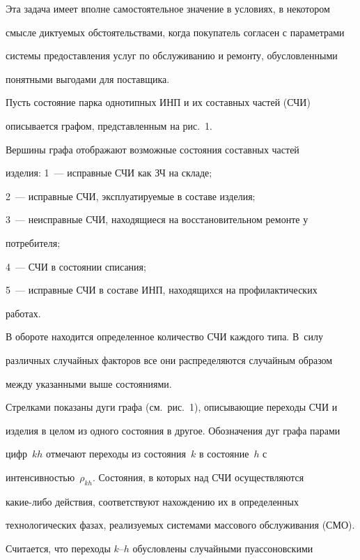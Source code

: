      Эта задача имеет вполне самостоятельное значение в условиях, в некото\-ром

смысле диктуемых обстоятельствами, когда покупатель согласен с параметрами

системы пред\-остав\-ле\-ния услуг по обслуживанию и ремонту, обусловленными

понятными выгодами для поставщика.









     Пусть состояние парка однотипных ИНП и их составных частей (СЧИ)

описывается графом, представленным на рис.~1.



     Вершины графа отображают возможные состояния составных частей

изделия: 1~--- исправные СЧИ как ЗЧ на складе;

    2~--- исправные СЧИ, эксплуатируемые в составе изделия;

    3~--- неисправные СЧИ, находящиеся на восстановительном ремонте у

потребителя;

    4~--- СЧИ в состоянии списания;

    5~--- исправные СЧИ в составе ИНП, находящихся на профилактических

работах.



     В обороте находится определенное количество СЧИ каждого типа. В~силу

различных случайных факторов все они распределяются случайным образом

между указанными выше состояниями.



    Стрелками показаны дуги графа (см.\ рис.~1), описывающие переходы СЧИ и

изделия в целом из одного состояния в другое. Обозначения дуг графа парами

цифр~$kh$ отмечают переходы из состояния~$k$ в состояние~$h$ с

интенсивностью~$\rho_{kh}$. Состояния, в которых над СЧИ осуществляются

какие-либо действия, соответствуют нахождению их в определенных

технологических фазах, реализуемых системами массового обслуживания (СМО).

Считается, что переходы $k$--$h$ обусловлены случайными пуассоновскими

